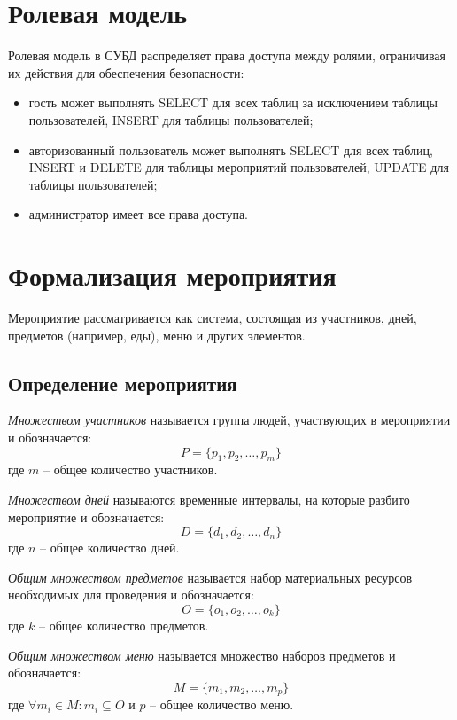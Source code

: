 \section{Ролевая модель}

Ролевая модель в СУБД распределяет права доступа между ролями, ограничивая их действия для обеспечения безопасности:
\begin{itemize}[label=--]
	\item гость может выполнять SELECT для всех таблиц за исключением таблицы пользователей, INSERT для таблицы пользователей;
	\item авторизованный пользователь может выполнять SELECT для всех таблиц, INSERT и DELETE для таблицы мероприятий пользователей, UPDATE для таблицы пользователей;
	\item администратор имеет все права доступа.
\end{itemize}

\section{Формализация мероприятия}

Мероприятие рассматривается как система, состоящая из участников, дней, предметов (например, еды), меню и других элементов. 

\subsection{Определение мероприятия}

\textit{Множеством участников} называется группа людей, участвующих в мероприятии и обозначается:
\begin{equation}
	P = \{p_1, p_2, \dots, p_m\}
\end{equation}
где $m$ -- общее количество участников.

\textit{Множеством дней} называются временные интервалы, на которые разбито мероприятие и обозначается:
\begin{equation}
	D = \{d_1, d_2, \dots, d_n\}
\end{equation}
где $n$ -- общее количество дней.

\textit{Общим множеством предметов} называется набор материальных ресурсов необходимых для проведения и обозначается:
\begin{equation}
	O = \{o_1, o_2, \dots, o_k\}
\end{equation}
где $k$ -- общее количество предметов.

\textit{Общим множеством меню} называется множество наборов предметов  и обозначается:
\begin{equation}
	M = \{m_1, m_2, \dots, m_p\}
\end{equation}
где $\forall m_i \in M: m_i \subseteq O$ и $p$ -- общее количество меню.

